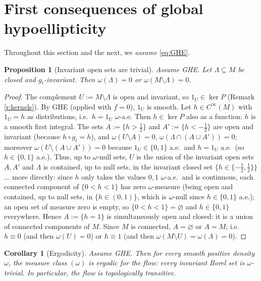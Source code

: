 \documentclass[11pt]{amsart}
\theoremstyle{plain}
\newtheorem{proposition}[theorem]{Proposition}
\newtheorem{corollary}[theorem]{Corollary}
\theoremstyle{definition}
\theoremstyle{remark}
\newcommand{\flow}{g_t}
\begin{document}
\section{First consequences of global hypoellipticity}\label{s:first}

Throughout this section and the next, we \emph{assume} \eqref{eq:GHE}.

\begin{proposition}[Invariant open sets are trivial]\label{p:opensets}
Assume GHE.  Let $\Lambda\subseteq M$ be closed and
$\flow$-invariant.  Then $\omega(\Lambda)=0$ or
$\omega(M\setminus\Lambda)=0$.
\end{proposition}

\begin{proof}
The complement $U:=M\setminus\Lambda$ is open and invariant, so
$1_U\in\ker P$ (Remark \ref{r:kernels}).  By GHE (applied with $f=0$),
$1_U$ is smooth.  Let $h\in C^\infty(M)$ with $1_U=h$ as
distributions, i.e.\ $h=1_U$ $\omega$-a.e.  Then $h\in\ker P$ also as
a function: $h$ is a smooth first integral.  The sets
$A:=\{h>\tfrac12\}$ and $A':=\{h<-\tfrac12\}$ are open and invariant
(because $h\circ g_t=h$), and $\omega(U\setminus A)=0$,
$\omega(\Lambda\cap(A\cup A'))=0$; moreover
$\omega(U\setminus(A\cup A'))=0$ because $1_U\in\{0,1\}$ a.e.\ and
$h=1_U$ a.e.\ (so $h\in\{0,1\}$ a.e.).  Thus, up to $\omega$-null
sets, $U$ is the union of the invariant open sets $A,A'$ and
$\Lambda$ is contained, up to null sets, in the invariant closed set
$\{h\in\{-\tfrac12,\tfrac12\}\}$... more directly: since $h$ only
takes the values $0,1$ $\omega$-a.e.\ and is continuous, each
connected component of $\{0<h<1\}$ has zero $\omega$-measure (being
open and contained, up to null sets, in
$\{h\in(0,1)\}$, which is $\omega$-null since $h\in\{0,1\}$ a.e.);
an open set of measure zero is empty, so $\{0<h<1\}=\varnothing$ and
$h\in\{0,1\}$ everywhere.  Hence $A:=\{h=1\}$ is simultaneously open
and closed: it is a union of connected components of $M$.  Since $M$
is connected, $A=\varnothing$ or $A=M$; i.e.\ $h\equiv 0$ (and then
$\omega(U)=0$) or $h\equiv 1$ (and then $\omega(M\setminus U)=
\omega(\Lambda)=0$).
\end{proof}

\begin{corollary}[Ergodicity]\label{c:erg}
Assume GHE.  Then for every smooth positive density $\omega$, the
measure class $(\omega)$ is ergodic for the flow: every invariant
Borel set is $\omega$-trivial.  In particular, the flow is
topologically transitive.
\end{corollary}
\end{document}
